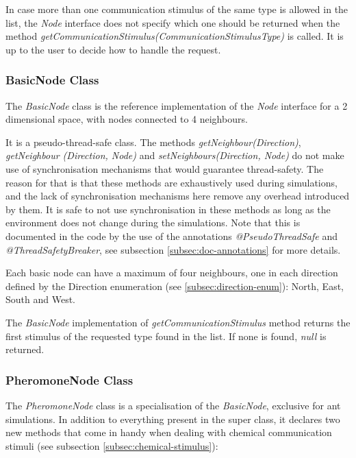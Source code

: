 In case more than one communication stimulus of the same type is allowed in the list, the \emph{Node} interface does not specify which one should be returned when the method \emph{getCommunicationStimulus(CommunicationStimulusType)} is called. It is up to the user to decide how to handle the request.

\subsubsection{BasicNode Class}

The \emph{BasicNode} class is the reference implementation of the \emph{Node} interface for a 2 dimensional space, with nodes connected to 4 neighbours.

It is a pseudo-thread-safe class. The methods \emph{getNeighbour(Direction)}, \emph{getNeighbour (Direction, Node)} and \emph{setNeighbours(Direction, Node)} do not make use of synchronisation mechanisms that would guarantee thread-safety. The reason for that is that these  methods are exhaustively used during simulations, and the lack of synchronisation mechanisms here remove any overhead introduced by them. It is safe to not use synchronisation in these methods as long as the environment does not change during the simulations. Note that this is documented in the code by the use of the annotations \emph{@PseudoThreadSafe} and \emph{@ThreadSafetyBreaker}, see subsection \ref{subsec:doc-annotations} for more details.

Each basic node can have a maximum of four neighbours, one in each direction defined by the Direction enumeration (see \ref{subsec:direction-enum}): North, East, South and West.

The \emph{BasicNode} implementation of \emph{getCommunicationStimulus} method returns the first stimulus of the requested type found in the list. If none is found, \emph{null} is returned.

\subsubsection{PheromoneNode Class}

The \emph{PheromoneNode} class is a specialisation of the \emph{BasicNode}, exclusive for ant simulations. In addition to everything present in the super class, it declares two new methods that come in handy when dealing with chemical communication stimuli (see subsection \ref{subsec:chemical-stimulus}):

